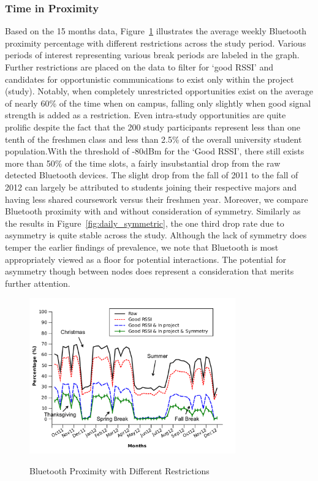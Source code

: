 \subsubsection*{Time in Proximity}
Based on the 15 months data, Figure~\ref{fig:bluetooth} illustrates the average weekly Bluetooth proximity percentage with different restrictions across the study period.  Various periods of interest representing various break periods are labeled in the graph. Further restrictions are placed on the data to filter for `good RSSI' and candidates for opportunistic communications to exist only within the project (study).   Notably, when completely unrestricted opportunities exist on the average of nearly 60\% of the time when on campus, falling only slightly when good signal strength is added as a restriction.  Even intra-study opportunities are quite prolific despite the fact that the 200 study participants represent less than one tenth of the freshmen class and less than 2.5\% of the overall university student population.With the threshold of -80dBm for the `Good RSSI', there still exists more than 50\% of the time slots, a fairly insubstantial drop from the raw detected Bluetooth devices. The slight drop from the fall of 2011 to the fall of 2012 can largely be attributed to students joining their respective majors and having less shared coursework versus their freshmen year.  Moreover, we compare Bluetooth proximity with and without consideration of symmetry. Similarly as the results in Figure~\ref{fig:daily_symmetric}, the one third drop rate due to asymmetry is quite stable across the study.  Although the lack of symmetry does temper the earlier findings of prevalence, we note that Bluetooth is most appropriately viewed as a floor for potential interactions.  The potential for asymmetry though between nodes does represent a consideration that merits further attention.  

\begin{figure}[tbp]
\centering 
{\includegraphics[width=3.5in]{graphs/weekly_bluetooth_with_symmetry_tag.pdf}}
\caption{Bluetooth Proximity with Different Restrictions} 
\label{fig:bluetooth}
\end{figure} 

